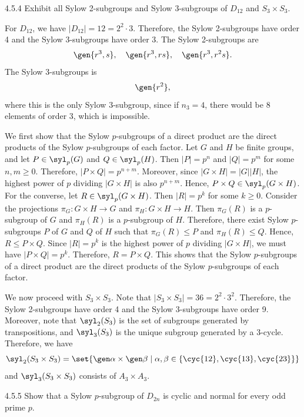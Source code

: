 \begin{exercise}{4.5.4}
	Exhibit all Sylow 2-subgroups and Sylow 3-subgroups of $D_{12}$ and $S_3 \times S_3$.
\end{exercise}

\begin{sol}
	For $D_{12}$, we have $|D_{12}| = 12 = 2^2 \cdot 3$.
	Therefore, the Sylow 2-subgroups have order 4 and the Sylow 3-subgroups have order 3.
	The Sylow 2-subgroups are
	\[
		\gen{r^3, s}, \quad \gen{r^3, rs}, \quad \gen{r^3, r^2s}.
	\]
	The Sylow 3-subgroups is
	\[
		\gen{r^2},
	\]
	where this is the only Sylow 3-subgroup, since if $n_3 = 4$, there would be $8$ elements of order $3$, which is impossible.

	We first show that the Sylow $p$-subgroups of a direct product are the direct products of the Sylow $p$-subgroups of each factor.
	Let $G$ and $H$ be finite groups, and let $P \in \syl_p(G)$ and $Q \in \syl_p(H)$.
	Then $|P| = p^n$ and $|Q| = p^m$ for some $n, m \geq 0$.
	Therefore, $|P \times Q| = p^{n + m}$.
	Moreover, since $|G \times H| = |G||H|$, the highest power of $p$ dividing $|G \times H|$ is also $p^{n + m}$.
	Hence, $P \times Q \in \syl_p(G \times H)$.
	For the converse, let $R \in \syl_p(G \times H)$.
	Then $|R| = p^k$ for some $k \geq 0$.
	Consider the projections $\pi_G : G \times H \to G$ and $\pi_H : G \times H \to H$.
	Then $\pi_G(R)$ is a $p$-subgroup of $G$ and $\pi_H(R)$ is a $p$-subgroup of $H$.
	Therefore, there exist Sylow $p$-subgroups $P$ of $G$ and $Q$ of $H$ such that $\pi_G(R) \leq P$ and $\pi_H(R) \leq Q$.
	Hence, $R \leq P \times Q$.
	Since $|R| = p^k$ is the highest power of $p$ dividing $|G \times H|$, we must have $|P \times Q| = p^k$.
	Therefore, $R = P \times Q$.
	This shows that the Sylow $p$-subgroups of a direct product are the direct products of the Sylow $p$-subgroups of each factor.

	We now proceed with $S_3 \times S_3$.
	Note that $|S_3 \times S_3| = 36 = 2^2 \cdot 3^2$.
	Therefore, the Sylow 2-subgroups have order 4 and the Sylow 3-subgroups have order 9.
	Moreover, note that $\syl_2(S_3)$ is the set of subgroups generated by transpositions, and $\syl_3(S_3)$ is the unique subgroup generated by a 3-cycle.
	Therefore, we have
	\[
		\syl_2(S_3 \times S_3) = \set{\gen\alpha \times \gen\beta \mid \alpha, \beta \in \{\cyc{1 2}, \cyc{1 3}, \cyc{2 3}}\}
	\]
	and $\syl_3(S_3 \times S_3)$ consists of $A_3 \times A_3$.
\end{sol}

\begin{exercise}{4.5.5}
	Show that a Sylow $p$-subgroup of $D_{2n}$ is cyclic and normal for every odd prime $p$.
\end{exercise}

